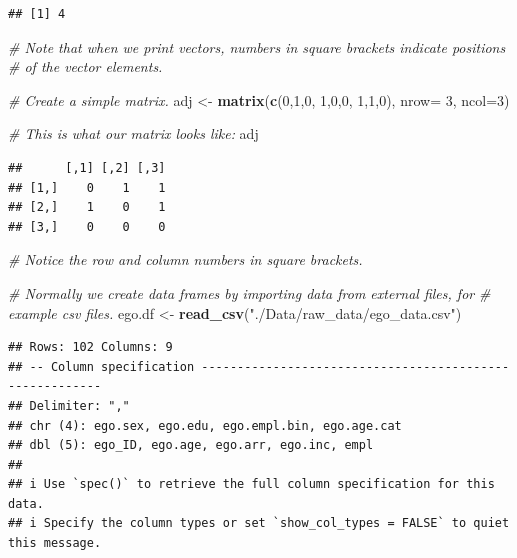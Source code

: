 \documentclass[
]{book}
\newenvironment{Shaded}{\begin{snugshade}}{\end{snugshade}}
\newcommand{\AttributeTok}[1]{\textcolor[rgb]{0.13,0.29,0.53}{#1}}
\newcommand{\CommentTok}[1]{\textcolor[rgb]{0.56,0.35,0.01}{\textit{#1}}}
\newcommand{\DecValTok}[1]{\textcolor[rgb]{0.00,0.00,0.81}{#1}}
\newcommand{\FunctionTok}[1]{\textcolor[rgb]{0.13,0.29,0.53}{\textbf{#1}}}
\newcommand{\NormalTok}[1]{#1}
\newcommand{\OtherTok}[1]{\textcolor[rgb]{0.56,0.35,0.01}{#1}}
\newcommand{\StringTok}[1]{\textcolor[rgb]{0.31,0.60,0.02}{#1}}
\begin{document}
\begin{verbatim}
## [1] 4
\end{verbatim}

\begin{Shaded}
\begin{Highlighting}[]
\CommentTok{\# Note that when we print vectors, numbers in square brackets indicate positions}
\CommentTok{\# of the vector elements.}

\CommentTok{\# Create a simple matrix.}
\NormalTok{adj }\OtherTok{\textless{}{-}} \FunctionTok{matrix}\NormalTok{(}\FunctionTok{c}\NormalTok{(}\DecValTok{0}\NormalTok{,}\DecValTok{1}\NormalTok{,}\DecValTok{0}\NormalTok{, }\DecValTok{1}\NormalTok{,}\DecValTok{0}\NormalTok{,}\DecValTok{0}\NormalTok{, }\DecValTok{1}\NormalTok{,}\DecValTok{1}\NormalTok{,}\DecValTok{0}\NormalTok{), }\AttributeTok{nrow=} \DecValTok{3}\NormalTok{, }\AttributeTok{ncol=}\DecValTok{3}\NormalTok{)}

\CommentTok{\# This is what our matrix looks like:}
\NormalTok{adj}
\end{Highlighting}
\end{Shaded}

\begin{verbatim}
##      [,1] [,2] [,3]
## [1,]    0    1    1
## [2,]    1    0    1
## [3,]    0    0    0
\end{verbatim}

\begin{Shaded}
\begin{Highlighting}[]
\CommentTok{\# Notice the row and column numbers in square brackets. }

\CommentTok{\# Normally we create data frames by importing data from external files, for}
\CommentTok{\# example csv files.}
\NormalTok{ego.df }\OtherTok{\textless{}{-}} \FunctionTok{read\_csv}\NormalTok{(}\StringTok{"./Data/raw\_data/ego\_data.csv"}\NormalTok{)}
\end{Highlighting}
\end{Shaded}

\begin{verbatim}
## Rows: 102 Columns: 9
## -- Column specification --------------------------------------------------------
## Delimiter: ","
## chr (4): ego.sex, ego.edu, ego.empl.bin, ego.age.cat
## dbl (5): ego_ID, ego.age, ego.arr, ego.inc, empl
## 
## i Use `spec()` to retrieve the full column specification for this data.
## i Specify the column types or set `show_col_types = FALSE` to quiet this message.
\end{verbatim}
\end{document}
